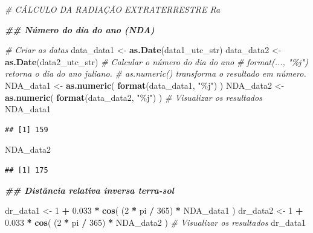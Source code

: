 \documentclass[
]{article}
\newenvironment{Shaded}{\begin{snugshade}}{\end{snugshade}}
\newcommand{\CommentTok}[1]{\textcolor[rgb]{0.56,0.35,0.01}{\textit{#1}}}
\newcommand{\DecValTok}[1]{\textcolor[rgb]{0.00,0.00,0.81}{#1}}
\newcommand{\DocumentationTok}[1]{\textcolor[rgb]{0.56,0.35,0.01}{\textbf{\textit{#1}}}}
\newcommand{\FloatTok}[1]{\textcolor[rgb]{0.00,0.00,0.81}{#1}}
\newcommand{\FunctionTok}[1]{\textcolor[rgb]{0.13,0.29,0.53}{\textbf{#1}}}
\newcommand{\NormalTok}[1]{#1}
\newcommand{\OtherTok}[1]{\textcolor[rgb]{0.56,0.35,0.01}{#1}}
\newcommand{\SpecialCharTok}[1]{\textcolor[rgb]{0.81,0.36,0.00}{\textbf{#1}}}
\newcommand{\StringTok}[1]{\textcolor[rgb]{0.31,0.60,0.02}{#1}}
\begin{document}
\begin{Shaded}
\begin{Highlighting}[]
\CommentTok{\# CÁLCULO DA RADIAÇÃO EXTRATERRESTRE Ra }

\DocumentationTok{\#\# Número do dia do ano (NDA)}

\CommentTok{\# Criar as datas}
\NormalTok{data\_data1 }\OtherTok{\textless{}{-}} \FunctionTok{as.Date}\NormalTok{(data1\_utc\_str)}
\NormalTok{data\_data2 }\OtherTok{\textless{}{-}} \FunctionTok{as.Date}\NormalTok{(data2\_utc\_str)}
\CommentTok{\# Calcular o número do dia do ano}
\CommentTok{\# format(..., "\%j") retorna o dia do ano juliano. }
\CommentTok{\# as.numeric() transforma o resultado em número.}
\NormalTok{NDA\_data1 }\OtherTok{\textless{}{-}} \FunctionTok{as.numeric}\NormalTok{(}
  \FunctionTok{format}\NormalTok{(data\_data1, }\StringTok{"\%j"}\NormalTok{)}
\NormalTok{)}
\NormalTok{NDA\_data2 }\OtherTok{\textless{}{-}} \FunctionTok{as.numeric}\NormalTok{(}
  \FunctionTok{format}\NormalTok{(data\_data2, }\StringTok{"\%j"}\NormalTok{)}
\NormalTok{)}
\CommentTok{\# Visualizar os resultados}
\NormalTok{NDA\_data1}
\end{Highlighting}
\end{Shaded}

\begin{verbatim}
## [1] 159
\end{verbatim}

\begin{Shaded}
\begin{Highlighting}[]
\NormalTok{NDA\_data2}
\end{Highlighting}
\end{Shaded}

\begin{verbatim}
## [1] 175
\end{verbatim}

\begin{Shaded}
\begin{Highlighting}[]
\DocumentationTok{\#\# Distância relativa inversa terra{-}sol}

\NormalTok{dr\_data1 }\OtherTok{\textless{}{-}} \DecValTok{1} \SpecialCharTok{+} \FloatTok{0.033} \SpecialCharTok{*} \FunctionTok{cos}\NormalTok{(}
\NormalTok{  (}\DecValTok{2} \SpecialCharTok{*}\NormalTok{ pi }\SpecialCharTok{/} \DecValTok{365}\NormalTok{) }\SpecialCharTok{*}\NormalTok{ NDA\_data1}
\NormalTok{)}
\NormalTok{dr\_data2 }\OtherTok{\textless{}{-}} \DecValTok{1} \SpecialCharTok{+} \FloatTok{0.033} \SpecialCharTok{*} \FunctionTok{cos}\NormalTok{(}
\NormalTok{  (}\DecValTok{2} \SpecialCharTok{*}\NormalTok{ pi }\SpecialCharTok{/} \DecValTok{365}\NormalTok{) }\SpecialCharTok{*}\NormalTok{ NDA\_data2}
\NormalTok{)}
\CommentTok{\# Visualizar os resultados}
\NormalTok{dr\_data1}
\end{Highlighting}
\end{Shaded}
\end{document}
